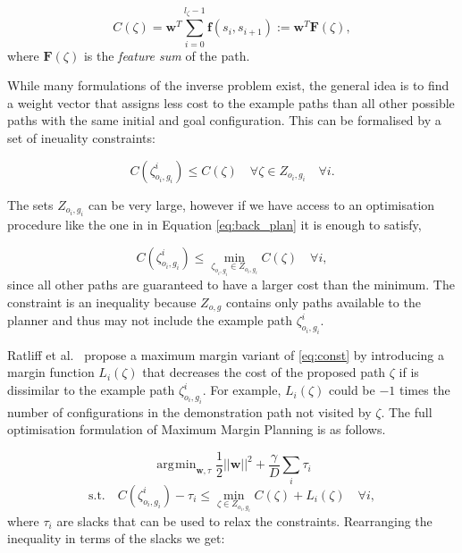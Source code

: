 \documentclass{article}  %
\DeclareMathOperator*{\argmin}{\arg\!\min}
\begin{document}
\begin{equation}
	C(\zeta) = \mathbf{w}^T\sum_{i=0}^{l_{\zeta}-1} \mathbf{f}(s_i,s_{i+1}) := \mathbf{w}^T \mathbf{F}(\zeta),
\end{equation}
where $\mathbf{F}(\zeta)$ is the \emph{feature sum} of the path.

While many formulations of the inverse problem exist, the general idea is to find a weight vector that assigns less cost to the example paths than all other possible paths with the same initial and goal configuration.  This can be formalised by a set of ineuality constraints:

\begin{equation}
	C(\zeta^i_{o_i,g_i}) \leq  C(\zeta) \quad \forall \zeta \in Z_{o_i,g_i}  \quad \forall i. \label{eq:const1}
\end{equation}

The sets $Z_{o_i,g_i}$ can be very large, however if we have access to an optimisation procedure like the one in in Equation \eqref{eq:back_plan} it is enough to satisfy, 

\begin{equation}
	C(\zeta^i_{o_i,g_i}) \leq \min_{\zeta_{o_i,g_i} \in Z_{o_i,g_i}} C(\zeta) \quad \forall i, \label{eq:const}
\end{equation}
since all other paths are guaranteed to have a larger cost than the minimum.
The constraint is an inequality because $Z_{o,g}$ contains only paths available to the planner and thus may not include the example path $\zeta^i_{o_i,g_i}$.

Ratliff et al.\ \cite{ratliff2006maximum} propose a maximum margin variant of \eqref{eq:const} by introducing a margin function $L_i(\zeta)$ that decreases the cost of the proposed path $\zeta$ if is dissimilar to the example path $\zeta^i_{o_i,g_i}$. For example, $L_i(\zeta)$ could be $-1$ times the number of configurations in the demonstration path not visited by $\zeta$. The full optimisation formulation of Maximum Margin Planning is as follows.

\begin{equation}
	\argmin_{\mathbf{w},\tau} \frac{1}{2}||\mathbf{w}||^2 + \frac{\gamma}{D} \sum_i \tau_i \label{eq:mas_marg}
\end{equation}
\begin{equation}
	\text{s.t.} \quad C(\zeta^i_{o_i,g_i}) - \tau_i \leq \min_{\zeta \in Z_{o_i,g_i}} C(\zeta) + L_i(\zeta) \quad \forall i,
\end{equation}
where $\tau_i$ are slacks that can be used to relax the constraints. Rearranging the inequality in terms of the slacks we get:
\end{document}
